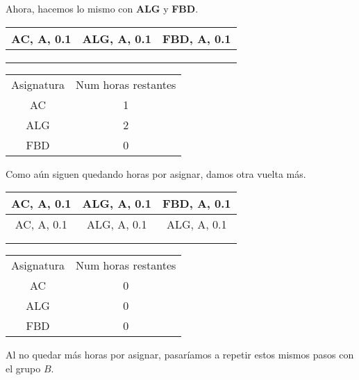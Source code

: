 Ahora, hacemos lo mismo con \textbf{ALG} y \textbf{FBD}.

\begin{minipage}{0.5\textwidth}    
\begin{tabular}{| c | c | c |}
\hline
AC, A, 0.1 & ALG, A, 0.1  & FBD, A, 0.1 \\
 \hline
 &  &  \\
 \hline
 &  &  \\
 \hline
 &  &  \\
 \hline 
\end{tabular}
\end{minipage}
\begin{minipage}{0.5\textwidth}
\begin{tabular}{c | c}
Asignatura & Num horas restantes \\
AC & 1 \\
ALG & 2 \\
FBD & 0
\end{tabular}
\end{minipage}

Como aún siguen quedando horas por asignar, damos otra vuelta más.

\begin{minipage}{0.5\textwidth}    
\begin{tabular}{| c | c | c |}
\hline
AC, A, 0.1 & ALG, A, 0.1  & FBD, A, 0.1 \\
 \hline
AC, A, 0.1 & ALG, A, 0.1 & ALG, A, 0.1  \\
 \hline
 &  &  \\
 \hline
 &  &  \\
 \hline 
\end{tabular}
\end{minipage}
\begin{minipage}{0.5\textwidth}
\begin{tabular}{c | c}
Asignatura & Num horas restantes \\
AC & 0 \\
ALG & 0 \\
FBD & 0
\end{tabular}
\end{minipage}

Al no quedar más horas por asignar, pasaríamos a repetir estos mismos pasos con el grupo $B$.
